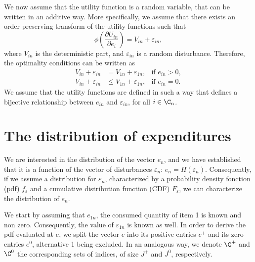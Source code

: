 \documentclass[12pt,a4paper]{article}
\begin{document}
We now assume that the utility function is a random variable, that can be written in an additive way. More specifically, we assume that there exists an order preserving transform of the utility functions such that
\begin{equation}
\phi\left(\frac{\partial U_{in}}{\partial e_i}\right) = V_{in} + \varepsilon_{in},
\end{equation}
where $V_{in}$ is the deterministic part, and $\varepsilon_{in}$ is a random disturbance. Therefore, the optimality conditions can be written as
\begin{align}
V_{in} + \varepsilon_{in}  &= V_{1n} + \varepsilon_{1n},  & \text{if } e_{in} > 0, \label{eq:non_zero}\\
V_{in} + \varepsilon_{in}  &\leq V_{1n} + \varepsilon_{1n},  & \text{if } e_{in} = 0. \label{eq:zero}
\end{align}
We assume that the utility functions are defined in such a way that
 defines a bijective relationship between $e_{in}$ and
$\varepsilon_{in}$, for all $i\in\C_n$.

\section{The distribution of expenditures}

We are interested in the distribution of the vector $e_n$, and we have
established that it is a function of the vector of disturbances
$\varepsilon_n$: $e_n = H(\varepsilon_n)$.  Consequently, if we assume
a distribution for $\varepsilon_n$, characterized by a probability
density fonction (pdf) $f_\varepsilon$ and a cumulative distribution
function (CDF) $F_\varepsilon$, we can characterize the distribution of $e_n$.

We start by assuming that $e_{1n}$, the consumed quantity of item 1 is
known and non zero. Consequently, the value of $\varepsilon_{1n}$ is known as
well. In order to derive the pdf evaluated at $e$, we split the vector $e$ into its positive entries $e^+$ and its zero entries $e^0$, alternative 1 being excluded. In an analogous way, we denote $\C^+$ and $\C^0$ the corresponding sets of indices, of size $J^+$ and $J^0$, respectively. 
\end{document}
